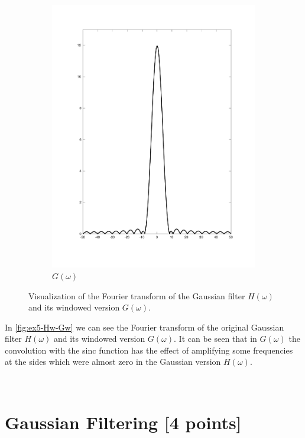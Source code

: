 \documentclass[tikz,14pt,fleqn]{article}
\begin{document}
\begin{figure}[H]
\begin{subfigure}{0.49\linewidth}
        \includegraphics[width=\linewidth]{fig/5.gw.pdf}
        \caption{$G(\omega)$}
        \label{fig:ex5-Gw}
    \end{subfigure}
    \caption{Visualization of the Fourier transform of the Gaussian filter $H(\omega)$ and its windowed version $G(\omega)$.}
    \label{fig:ex5-Hw-Gw}
\end{figure}


In \autoref{fig:ex5-Hw-Gw} we can see the Fourier transform of the original Gaussian filter $H(\omega)$ and its windowed version $G(\omega)$. It can be seen that in $G(\omega)$ the convolution with the sinc function has the effect of amplifying some frequencies at the sides which were almost zero in the Gaussian version $H(\omega)$.

\clearpage 
\section{Gaussian Filtering [4 points]}
\end{document}
